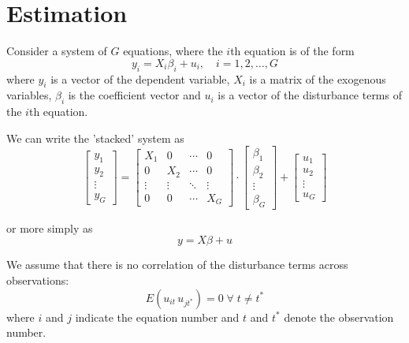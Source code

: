 \section{Estimation}\label{sec:Estimation}

Consider a system of $G$ equations, where the $i$th equation is of
the form 
\begin{equation}
   y_{i} = X_i \beta_i + u_i, \quad i = 1, 2, \ldots, G
\end{equation}
where $y_i$ is a vector of the dependent variable,
$X_i$ is a matrix of the exogenous variables,
$\beta_i$ is the coefficient vector and
$u_i$ is a vector of the disturbance terms of the $i$th equation.

We can write the 'stacked' system as
\begin{equation}
   \left[ \begin{array}{c}
      y_1 \\ y_2\\ \vdots\\ y_G
   \end{array} \right] = 
   \left[ \begin{array}{cccc}
      X_1 & 0 & \cdots & 0\\
      0 & X_2 & \cdots & 0\\
      \vdots & \vdots & \ddots & \vdots\\
      0 & 0 & \cdots & X_G
   \end{array}\right] \cdot 
   \left[ \begin{array}{c}
      \beta_1 \\ \beta_2 \\ \vdots\\ \beta_G
   \end{array} \right] +
   \left[ \begin{array}{c}
      u_1 \\ u_2 \\ \vdots\\ u_G
   \end{array} \right]
\end{equation}

or more simply as
\begin{equation}
   y = X \beta + u 
\end{equation}   

We assume that there is no correlation of the disturbance terms 
across observations:
\begin{equation}
   E \left( u_{it} \, u_{jt^*} \right) = 0 
   \; \forall \; t \neq t^*
\end{equation}
where $i$ and $j$ indicate the equation number 
and $t$ and $t^*$ denote the observation number.


